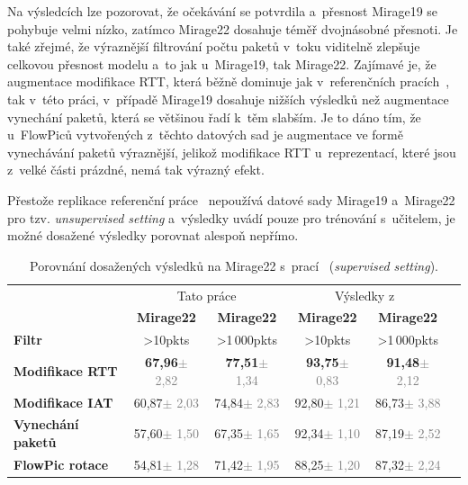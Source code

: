 Na výsledcích lze pozorovat, že očekávání se potvrdila a~přesnost Mirage19 se pohybuje velmi nízko, zatímco Mirage22 dosahuje téměř dvojnásobné přesnoti. Je také zřejmé, že výraznější filtrování počtu paketů v~toku viditelně zlepšuje celkovou přesnost modelu a~to jak u~Mirage19, tak Mirage22. Zajímavé je, že augmentace modifikace RTT, která běžně dominuje jak v~referenčních pracích~\cite{flowpic_augmentations, huawei_paper}, tak v~této práci, v~případě Mirage19 dosahuje nižších výsledků než augmentace vynechání paketů, která se většinou řadí k~těm slabším. Je to dáno tím, že u~FlowPiců vytvořených z~těchto datových sad je augmentace ve formě vynechávání paketů výraznější, jelikož modifikace RTT u~reprezentací, které jsou z~velké části prázdné, nemá tak výrazný efekt.

Přestože replikace referenční práce~\cite{huawei_paper} nepoužívá datové sady Mirage19 a~Mirage22 pro tzv. \textit{unsupervised setting} a~výsledky uvádí pouze pro trénování s~učitelem, je možné dosažené výsledky porovnat alespoň nepřímo.
\begin{table}[H]
    \centering
        \begin{tabular}{l c c c c c}
            \toprule
             & \multicolumn{2}{c}{Tato práce} & \multicolumn{2}{c}{Výsledky z~\cite{huawei_paper}}\\
            \cmidrule(lr){2-3} \cmidrule(lr){4-5}
              & \textbf{Mirage22} & \textbf{Mirage22} & \textbf{Mirage22} & \textbf{Mirage22} \\
             \textbf{Filtr} & >10pkts & >1\,000pkts & >10pkts & >1\,000pkts \\
            \midrule
            \textbf{Modifikace RTT} & \textbf{67,96}{\tiny\textcolor{gray}{$\pm$ 2,82}} & \textbf{77,51}{\tiny\textcolor{gray}  {$\pm$ 1,34}} & \textbf{93,75}{\tiny\textcolor{gray}{$\pm$ 0,83}} & \textbf{91,48}{\tiny\textcolor{gray}{$\pm$    2,12}}\\
            \textbf{Modifikace IAT} & 60,87{\tiny\textcolor{gray}{$\pm$ 2,03}} & 74,84{\tiny\textcolor{gray}{$\pm$ 2,83}} &     92,80{\tiny\textcolor{gray}{$\pm$ 1,21}} & 86,73{\tiny\textcolor{gray}{$\pm$ 3,88}}\\
            \textbf{Vynechání paketů} & 57,60{\tiny\textcolor{gray}{$\pm$ 1,50}} & 67,35{\tiny\textcolor{gray}{$\pm$ 1,65}} &   92,34{\tiny\textcolor{gray}{$\pm$ 1,10}} & 87,19{\tiny\textcolor{gray}{$\pm$ 2,52}}\\
            \textbf{FlowPic rotace} & 54,81{\tiny\textcolor{gray}{$\pm$ 1,28}} & 71,42{\tiny\textcolor{gray}{$\pm$ 1,95}} &     88,25{\tiny\textcolor{gray}{$\pm$ 1,20}} & 87,32{\tiny\textcolor{gray}{$\pm$ 2,24}}\\
            \bottomrule
        \end{tabular}
    \caption{Porovnání dosažených výsledků na Mirage22 s~prací~\cite{huawei_paper} (\textit{supervised setting}).}
\end{table}



